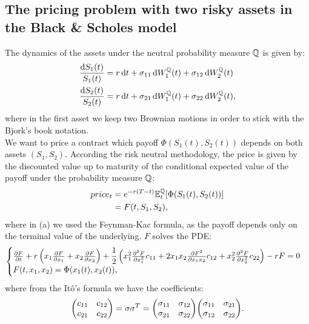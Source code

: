 \subsection[Pricing]{The pricing problem with two risky assets in the Black \& Scholes model}
The dynamics of the assets under the neutral probability measure $\mathbb{Q}$ is given by:
\begin{align}
    \dfrac{\dd S_1(t)}{S_1(t)} &= r\,\dd t + \sigma_{11}\,\dd W_1^{\mathbb{Q}}(t) + \sigma_{12}\,\dd W_2^{\mathbb{Q}}(t) \\
    \dfrac{\dd S_2(t)}{S_2(t)} &= r\,\dd t + \sigma_{21}\,\dd W_1^{\mathbb{Q}}(t) + \sigma_{22}\,\dd W_2^{\mathbb{Q}}(t),
\end{align}
where in the first asset we keep two Brownian motions in order to stick with the Bjork's book notation. \\
We want to price a contract which payoff $\Phi(S_1(t),S_2(t))$ depends on both assets $(S_1,S_2)$. According the risk neutral methodology, the price is given by the discounted value up to maturity of the conditional expected value of the payoff under the probability measure $\mathbb{Q}$:
\begin{align}
    price_t &= e^{-r(T-t)}\mathbb{E}^{\mathbb{Q}}_t[\Phi(S_1(t),S_2(t))] \\
    &=
    F(t,S_1,S_2),
\end{align}
where in (a) we used the Feynman-Kac formula, as the payoff depends only on the terminal value of the underlying. $F$ solves the PDE: %
\begin{equation}\label{bspdee}
    \begin{cases}
    \pdv{F}{t} + r\left(x_1\pdv{F}{x_1} + x_2\pdv{F}{x_2}\right) + \dfrac{1}{2}\left(x_1^2\pdv[2]{F}{x_1}c_{11} + 2x_1x_2\pdv{F^2}{x_1x_2}c_{12} + x_2^2\pdv[2]{F}{x_2}c_{22}\right) - rF = 0 \\
    F(t,x_1,x_2) = \Phi(x_1(t),x_2(t)),
    \end{cases}
\end{equation}
where from the Itô's formula we have the coefficients:
\begin{equation}
    \mqty(c_{11}&c_{12}\\c_{21}&c_{22}) = \sigma\sigma^T = \mqty(\sigma_{11}&\sigma_{12}\\\sigma_{21}&\sigma_{22})\mqty(\sigma_{11}&\sigma_{21}\\\sigma_{12}&\sigma_{22}).
\end{equation}
